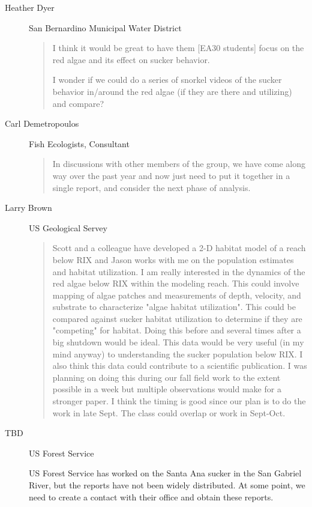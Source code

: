 \documentclass{tufte-handout}\usepackage[]{graphicx}\usepackage[]{color}
\begin{document}
\begin{description}
\item[Heather Dyer] San Bernardino Municipal Water District

\begin{quote}
I think it would be great to have them [EA30 students] focus on the red algae and its effect on sucker behavior.  

I wonder if we could do a series of snorkel videos of the sucker behavior in/around the red algae (if they are there and utilizing) and compare?

\end{quote}

\item[Carl Demetropoulos] Fish Ecologists, Consultant

\begin{quote}
In discussions with other members of the group, we have come along way over the past year and now just need to put it together in a single report, and consider the next phase of analysis.  
\end{quote}

\item[Larry Brown] US Geological Servey

\begin{quote}
Scott and a colleague have developed a 2-D habitat model of a reach below RIX and Jason works with me on the population estimates and habitat utilization. I am really interested in the dynamics of the red algae below RIX within the modeling reach. This could involve mapping of algae patches and measurements of depth, velocity, and substrate to characterize "algae habitat utilization". This could be compared against sucker habitat utilization to determine if they are "competing" for habitat. Doing this before and several times after a big shutdown would be ideal. This data would be very useful (in my mind anyway) to understanding the sucker population below RIX. I also think this data could contribute to a scientific publication. I was planning on doing this during our fall field work to the extent possible in a week but multiple observations would make for a stronger paper. I think the timing is good since our plan is to do the work in late Sept. The class could overlap or work in Sept-Oct.
\end{quote}

\item[TBD] US Forest Service

US Forest Service has worked on the Santa Ana sucker in the San Gabriel River, but the reports have not been widely distributed. At some point, we need to create a contact with their office and obtain these reports.


\end{description}
\end{document}
